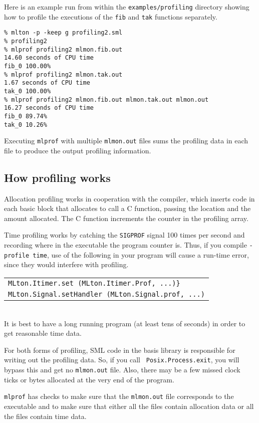 Here is an example run from within the {\tt examples/profiling}
directory showing how to profile the executions of the {\tt fib} and
{\tt tak} functions separately.

\begin{verbatim}
% mlton -p -keep g profiling2.sml
% profiling2
% mlprof profiling2 mlmon.fib.out
14.60 seconds of CPU time
fib_0 100.00%
% mlprof profiling2 mlmon.tak.out
1.67 seconds of CPU time
tak_0 100.00%
% mlprof profiling2 mlmon.fib.out mlmon.tak.out mlmon.out
16.27 seconds of CPU time
fib_0 89.74%
tak_0 10.26%
\end{verbatim}

Executing {\tt mlprof} with multiple {\tt mlmon.out} files sums the
profiling data in each file to produce the output profiling
information.

\subsection{How profiling works}

Allocation profiling works in cooperation with the compiler, which
inserts code in each basic block that allocates to call a C function,
passing the location and the amount allocated.  The C function
increments the counter in the profiling array.

Time profiling works by catching the {\tt SIGPROF} signal 100 times
per second and recording where in the executable the program counter
is.  Thus, if you compile {\tt -profile time}, use of the following in
your program will cause a run-time error, since they would interfere
with profiling.

\begin{tabular}{l}
\tt MLton.Itimer.set (MLton.Itimer.Prof, ...)\}\\
\tt MLton.Signal.setHandler (MLton.Signal.prof, ...)
\end{tabular}\\
It is best to have a long running program (at least tens of seconds)
in order to get reasonable time data.

For both forms of profiling, SML code in the basis library is
responsible for writing out the profiling data.  So, if you call {\tt
Posix.Process.exit}, you will bypass this and get no {\tt mlmon.out}
file.  Also, there may be a few missed clock ticks or bytes allocated
at the very end of the program.

{\tt mlprof} has checks to make sure that the {\tt mlmon.out} file
corresponds to the executable and to make sure that either all the
files contain allocation data or all the files contain time data.
